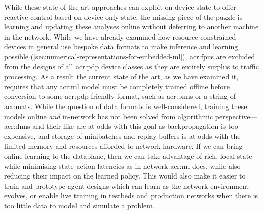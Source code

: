 While these state-of-the-art approaches can exploit on-device state to offer reactive control based on device-only state, the missing piece of the puzzle is learning and updating these analyses online without deferring to another machine in the network.
While we have already examined how resource-constrained devices in general use bespoke data formats to make inference and learning possible (\cref{sec:numerical-representations-for-embedded-ml}), \glspl{acr:fpu} are excluded from the designs of all \gls{acr:pdp} device classes as they are entirely surplus to traffic processing.
As a result the current state of the art, as we have examined it, requires that any \gls{acr:ml} model must be completely trained offline before conversion to some \gls{acr:pdp}-friendly format, such as \glspl{acr:bnn} or a string of \glspl{acr:mat}.
While the question of data formats is well-considered, training these models online \emph{and} in-network has not been solved from algorithmic perspective---\glspl{acr:dnn} and their like are at odds with this goal as backpropagation is too expensive, and storage of minibatches and replay buffers is at odds with the limited memory and resources afforded to network hardware.
If we can bring online learning to the dataplane, then we can take advantage of rich, local state while minimising state-action latencies as in-network \gls{acr:ml} does, while also reducing their impact on the learned policy.
This would also make it easier to train and prototype agent designs which can learn as the network environment evolves, or enable live training in testbeds and production networks when there is too little data to model and simulate a problem.

